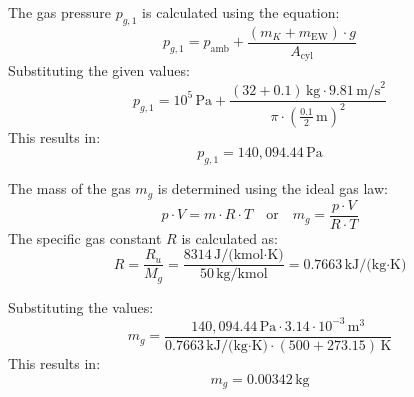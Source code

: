 The gas pressure \( p_{g,1} \) is calculated using the equation:  
\[
p_{g,1} = p_{\text{amb}} + \frac{(m_K + m_{\text{EW}}) \cdot g}{A_{\text{cyl}}}
\]  
Substituting the given values:  
\[
p_{g,1} = 10^5 \, \text{Pa} + \frac{(32 + 0.1) \, \text{kg} \cdot 9.81 \, \text{m/s}^2}{\pi \cdot \left(\frac{0.1}{2} \, \text{m}\right)^2}
\]  
This results in:  
\[
p_{g,1} = 140,094.44 \, \text{Pa}
\]  

The mass of the gas \( m_g \) is determined using the ideal gas law:  
\[
p \cdot V = m \cdot R \cdot T \quad \text{or} \quad m_g = \frac{p \cdot V}{R \cdot T}
\]  
The specific gas constant \( R \) is calculated as:  
\[
R = \frac{R_u}{M_g} = \frac{8314 \, \text{J/(kmol·K)}}{50 \, \text{kg/kmol}} = 0.7663 \, \text{kJ/(kg·K)}
\]  

Substituting the values:  
\[
m_g = \frac{140,094.44 \, \text{Pa} \cdot 3.14 \cdot 10^{-3} \, \text{m}^3}{0.7663 \, \text{kJ/(kg·K)} \cdot (500 + 273.15) \, \text{K}}
\]  
This results in:  
\[
m_g = 0.00342 \, \text{kg}
\]